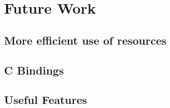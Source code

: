 

\chapter{Future Work}
\label{ch:future_work}

\section{More efficient use of resources}

\section{C Bindings}

\section{Useful Features}
